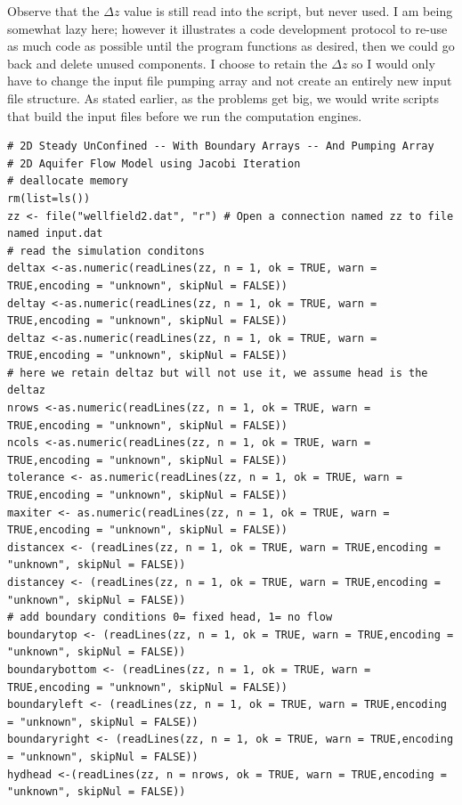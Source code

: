 Observe that the $\Delta z$ value is still read into the script, but never used.
I am being somewhat lazy here; however it illustrates a code development protocol to re-use as much code as possible until the program functions as desired, then we could go back and delete unused components.
I choose to retain the $\Delta z$ so I would only have to change the input file pumping array and not create an entirely new input file structure.  
As stated earlier, as the problems get big, we would write scripts that build the input files before we run the computation engines.
~\newpage
\begin{lstlisting}[caption= \textbf{R} script implementing unconfined aquifer flow computations with wells and generalized boundary conditions. , label=lst:UnconfinedSteady]
# 2D Steady UnConfined -- With Boundary Arrays -- And Pumping Array
# 2D Aquifer Flow Model using Jacobi Iteration
# deallocate memory
rm(list=ls())
zz <- file("wellfield2.dat", "r") # Open a connection named zz to file named input.dat
# read the simulation conditons
deltax <-as.numeric(readLines(zz, n = 1, ok = TRUE, warn = TRUE,encoding = "unknown", skipNul = FALSE))
deltay <-as.numeric(readLines(zz, n = 1, ok = TRUE, warn = TRUE,encoding = "unknown", skipNul = FALSE))
deltaz <-as.numeric(readLines(zz, n = 1, ok = TRUE, warn = TRUE,encoding = "unknown", skipNul = FALSE))
# here we retain deltaz but will not use it, we assume head is the deltaz
nrows <-as.numeric(readLines(zz, n = 1, ok = TRUE, warn = TRUE,encoding = "unknown", skipNul = FALSE))
ncols <-as.numeric(readLines(zz, n = 1, ok = TRUE, warn = TRUE,encoding = "unknown", skipNul = FALSE))
tolerance <- as.numeric(readLines(zz, n = 1, ok = TRUE, warn = TRUE,encoding = "unknown", skipNul = FALSE))
maxiter <- as.numeric(readLines(zz, n = 1, ok = TRUE, warn = TRUE,encoding = "unknown", skipNul = FALSE))
distancex <- (readLines(zz, n = 1, ok = TRUE, warn = TRUE,encoding = "unknown", skipNul = FALSE))
distancey <- (readLines(zz, n = 1, ok = TRUE, warn = TRUE,encoding = "unknown", skipNul = FALSE))
# add boundary conditions 0= fixed head, 1= no flow
boundarytop <- (readLines(zz, n = 1, ok = TRUE, warn = TRUE,encoding = "unknown", skipNul = FALSE))
boundarybottom <- (readLines(zz, n = 1, ok = TRUE, warn = TRUE,encoding = "unknown", skipNul = FALSE))
boundaryleft <- (readLines(zz, n = 1, ok = TRUE, warn = TRUE,encoding = "unknown", skipNul = FALSE))
boundaryright <- (readLines(zz, n = 1, ok = TRUE, warn = TRUE,encoding = "unknown", skipNul = FALSE))
hydhead <-(readLines(zz, n = nrows, ok = TRUE, warn = TRUE,encoding = "unknown", skipNul = FALSE))

\end{lstlisting}
